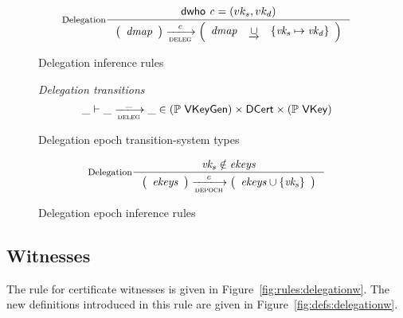 \begin{figure}
  \begin{equation}\label{eq:delegation}
    \inference[Delegation]
    {\dwho{c} = (vk_s, vk_d)
    }
    {
      \left(
      \begin{array}{r}
        \var{dmap}
      \end{array}
      \right)
      \trans{deleg}{c}
      \left(
      \begin{array}{lcl}
        \var{dmap} & \unionoverride & \{\var{vk_s} \mapsto \var{vk_d}\}
      \end{array}
      \right)
    }
  \end{equation}
  \caption{Delegation inference rules}
  \label{fig:rules:delegation}
\end{figure}

\begin{figure}
  \emph{Delegation transitions}
  \begin{equation*}
    \_ \vdash \_ \trans{deleg}{\_} \_ \in
      (\powerset \VKeyGen) \times \DCert \times (\powerset \VKey)
    \end{equation*}
  \caption{Delegation epoch transition-system types}
  \label{fig:ts-types:depoch}
\end{figure}

\begin{figure}
  \begin{equation}\label{eq:rule:depoch}
    \inference[Delegation]
    {\var{vk_s} \notin \var{ekeys}
    }
    {
      \left(
      \begin{array}{r}
        \var{ekeys}
      \end{array}
      \right)
      \trans{depoch}{c}
      \left(
      \begin{array}{lcl}
        \var{ekeys} \cup \{\var{vk_s}\}
      \end{array}
      \right)
    }
  \end{equation}
  \caption{Delegation epoch inference rules}
  \label{fig:rules:depoch}
\end{figure}


\subsection{Witnesses}
\label{sec:delegation-witnesses}

The rule for certificate witnesses is given in
Figure~\ref{fig:rules:delegationw}. The new definitions introduced in this rule
are given in Figure~\ref{fig:defs:delegationw}.

